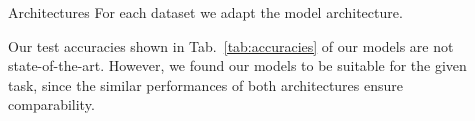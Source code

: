 \documentclass[final]{beamer}
\newlength{\sepwid}
\newlength{\onecolwid}
\newlength{\twocolwid}
\begin{document}
\begin{frame}[t]
\begin{columns}[t]
\begin{column}{\onecolwid}


\end{column} %

\begin{column}{\sepwid}\end{column} %

\begin{column}{\twocolwid} %

\begin{columns}[t,totalwidth=\twocolwid] %

\begin{column}{\onecolwid}\vspace{-.6in} %


\begin{block}{Architectures}
For each dataset we adapt the model architecture.
\vspace{1cm}

\begin{table}[h]
	\centering{}
	\caption{Test accuracies achieved by our networks.}
	\label{tab:accuracies}
\end{table}

Our test accuracies shown in Tab.~\ref{tab:accuracies} of our models are not state-of-the-art. However, we found our models to be suitable for the given task, since the similar performances of both architectures ensure comparability. 

\end{block}


\end{column}
\end{columns}
\end{column}
\end{columns}
\end{frame}
\end{document}
